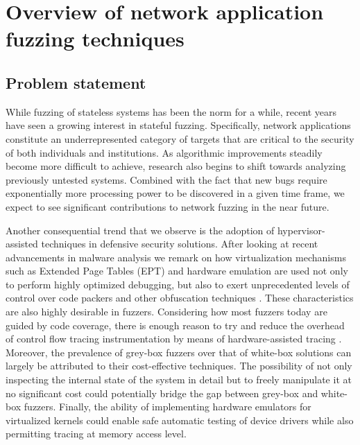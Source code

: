 \section{Overview of network application fuzzing techniques}
\label{extend:netfuzz}

\subsection{Problem statement}
\label{extend:netfuzz:intro}

While fuzzing of stateless systems has been the norm for a while, recent years have seen a growing interest in stateful fuzzing. Specifically, network applications constitute an underrepresented category of targets that are critical to the security of both individuals and institutions. As algorithmic improvements steadily become more difficult to achieve, research also begins to shift towards analyzing previously untested systems. Combined with the fact that new bugs require exponentially more processing power to be discovered \cite{bohme2020fuzzing} in a given time frame, we expect to see significant contributions to network fuzzing in the near future.

Another consequential trend that we observe is the adoption of hypervisor-assisted techniques in defensive security solutions. After looking at recent advancements in malware analysis \cite{leon2021hypervisor,karvandi2022hyperdbg} we remark on how virtualization mechanisms such as Extended Page Tables (EPT) and hardware emulation are used not only to perform highly optimized debugging, but also to exert unprecedented levels of control over code packers and other obfuscation techniques \cite{coccia2022study,visaggio2023state}. These characteristics are also highly desirable in fuzzers. Considering how most fuzzers today are guided by code coverage, there is enough reason to try and reduce the overhead of control flow tracing instrumentation by means of hardware-assisted tracing \cite{kadar2021safety,ding2021hardware}. Moreover, the prevalence of grey-box fuzzers over that of white-box solutions can largely be attributed to their cost-effective techniques. The possibility of not only inspecting the internal state of the system in detail but to freely manipulate it at no significant cost could potentially bridge the gap between grey-box and white-box fuzzers. Finally, the ability of implementing hardware emulators for virtualized kernels could enable safe automatic testing of device drivers while also permitting tracing at memory access level.

